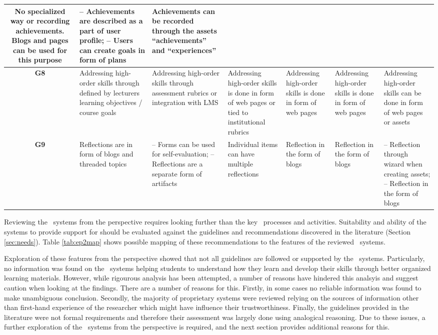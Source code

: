 \begin{sidewaystable}
\begin{tabular}{|c|p{3.25cm}|p{3.25cm}|p{3.25cm}|p{3.25cm}|p{3.25cm}|p{3.25cm}|}
	No specialized way or recording achievements. Blogs and pages can be used for
	this purpose & 
	-- Achievements are described as a part of user profile; \newline -- Users can
	create goals in form of plans & 
	Achievements can be recorded through the assets ``achievements''
	and ``experiences''	\\ \hline 
	\textbf{G8} & 
	Addressing high-order skills through defined by lecturers learning
	objectives / course goals & 
	Addressing high-order skills through assessment rubrics or integration with LMS
	& 
	Addressing high-order skills is done in form of web pages or tied to
	institutional rubrics & 
	Addressing high-order skills is done in form of web pages & 
	Addressing high-order skills is done in form of web pages & 
	Addressing high-order skills can be done in form of web pages or assets \\
	\hline 
	\textbf{G9} & 
	Reflections are in form of blogs and threaded topics & 
	-- Forms can be used for self-evaluation; \newline -- Reflections are a
	separate form of artifacts & 
	Individual items can have multiple reflections & 
	Reflection in the form of blogs & 
	Reflection in the form of blogs & 
	-- Reflection through wizard when creating assets; \newline -- Reflection in
	the form of blogs \\ \hline
	\end{tabular}
\label{tab:ep2map} 
\end{sidewaystable} 

Reviewing the \ep~systems from the \LLLs perspective requires looking further
than the key \ep~processes and activities. Suitability and ability of the
systems to provide support for \LLLs should be evaluated against the guidelines
and recommendations discovered in the literature (Section \ref{sec:needs}). Table
\ref{tab:ep2map} shows possible mapping of these recommendations to the features
of the reviewed \ep~systems. 

Exploration of these features from the \LLLs perspective showed that not all
guidelines are followed or supported by the \ep~systems. Particularly, no
information was found on the \ep~systems helping students to understand how they
learn and develop their skills through better organized learning materials.
However, while rigourous analysis has been attempted, a number of reasons have
hindered this analsyis and suggest caution when looking at the findings. There
are a number of reasons for this. Firstly, in some cases no reliable information
was found to make unambiguous conclusion. Secondly, the majority of proprietary
systems were reviewed relying on the sources of information other than
first-hand experience of the researcher which might have influence their
trustworthiness. Finally, the guidelines provided in the literature were not
formal requirements and therefore their assessment was largely done using
analogical reasoning. Due to these issues, a further exploration of the
\ep~systems from the \LLLs perspective is required, and the next section
provides additional reasons for this.

